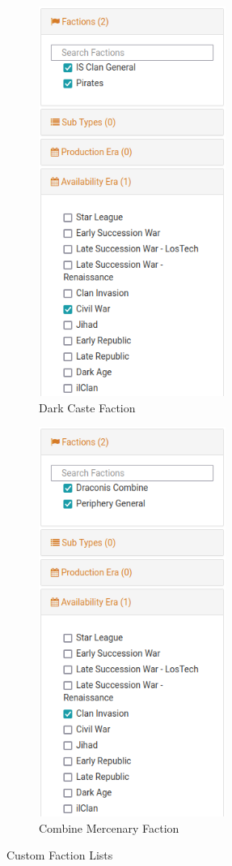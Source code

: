 \documentclass{article}
\begin{document}
\begin{figure}[!h]
  \centering
  \begin{subfigure}{0.4\textwidth}
    \centering
    \includegraphics[height=5.0in]{../img/Dark_Caste_List.png}
    \caption*{Dark Caste Faction}
  \end{subfigure}
  \hspace{1in}
  \begin{subfigure}{0.4\textwidth}
    \centering
    \includegraphics[height=5.0in]{../img/Combine_Mercenary_List.png}
    \caption*{Combine Mercenary Faction}
  \end{subfigure}
  \caption*{Custom Faction Lists}
\end{figure}
\end{document}
